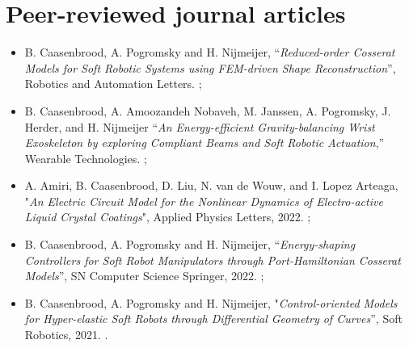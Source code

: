 \section*{Peer-reviewed journal articles}
\begin{itemize}[leftmargin=4mm]
\item B. Caasenbrood, A. Pogromsky and H. Nijmeijer, “\textit{Reduced-order Cosserat Models for Soft Robotic
 Systems using FEM-driven Shape Reconstruction}”, Robotics and Automation Letters. \ipj;
\item B. Caasenbrood, A. Amoozandeh Nobaveh, M. Janssen, A. Pogromsky, J. Herder, and H. Nijmeijer “\textit{An Energy-efficient Gravity-balancing Wrist Exoskeleton by exploring Compliant Beams and Soft Robotic Actuation},” Wearable Technologies. \ipj;
\item A. Amiri, B. Caasenbrood, D. Liu, N. van de Wouw, and I. Lopez Arteaga, "\textit{An Electric Circuit Model for the Nonlinear Dynamics of Electro-active Liquid Crystal Coatings}", Applied Physics Letters, 2022. \cur;
\item  B. Caasenbrood, A. Pogromsky and H. Nijmeijer, “\textit{Energy-shaping Controllers for Soft Robot Manipulators through Port-Hamiltonian Cosserat Models}”, SN Computer Science Springer, 2022. \cur;
\item B. Caasenbrood, A. Pogromsky and H. Nijmeijer, "\textit{Control-oriented Models for Hyper-elastic Soft Robots through Differential Geometry of Curves}”, Soft Robotics, 2021. \cur.
\end{itemize}


